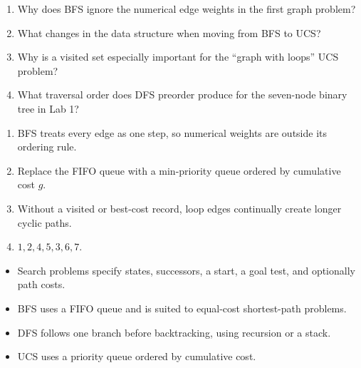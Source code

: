 

\begin{quickcheck}
\begin{enumerate}
  \item Why does BFS ignore the numerical edge weights in the first graph problem?
  \item What changes in the data structure when moving from BFS to UCS?
  \item Why is a visited set especially important for the ``graph with loops'' UCS problem?
  \item What traversal order does DFS preorder produce for the seven-node binary tree in Lab 1?
\end{enumerate}
\end{quickcheck}

\begin{checkanswers}
\begin{enumerate}
  \item BFS treats every edge as one step, so numerical weights are outside its ordering rule.
  \item Replace the FIFO queue with a min-priority queue ordered by cumulative cost \(g\).
  \item Without a visited or best-cost record, loop edges continually create longer cyclic paths.
  \item \(1,2,4,5,3,6,7\).
\end{enumerate}
\end{checkanswers}

\begin{chapterrecap}
\begin{itemize}
  \item Search problems specify states, successors, a start, a goal test, and optionally path costs.
  \item BFS uses a FIFO queue and is suited to equal-cost shortest-path problems.
  \item DFS follows one branch before backtracking, using recursion or a stack.
  \item UCS uses a priority queue ordered by cumulative cost.
\end{itemize}
\end{chapterrecap}
